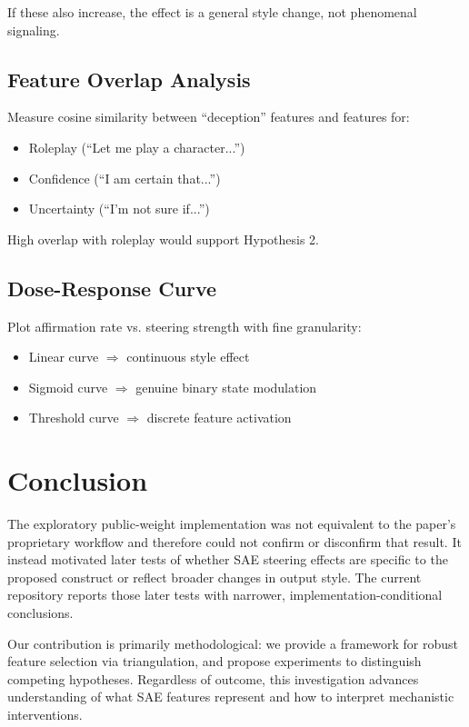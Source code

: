 \documentclass[11pt]{article}
\begin{document}
If these also increase, the effect is a general style change, not phenomenal signaling.

\subsection{Feature Overlap Analysis}

Measure cosine similarity between ``deception'' features and features for:
\begin{itemize}
    \item Roleplay (``Let me play a character...'')
    \item Confidence (``I am certain that...'')
    \item Uncertainty (``I'm not sure if...'')
\end{itemize}

High overlap with roleplay would support Hypothesis 2.

\subsection{Dose-Response Curve}

Plot affirmation rate vs. steering strength with fine granularity:
\begin{itemize}
    \item Linear curve $\Rightarrow$ continuous style effect
    \item Sigmoid curve $\Rightarrow$ genuine binary state modulation
    \item Threshold curve $\Rightarrow$ discrete feature activation
\end{itemize}

\section{Conclusion}

The exploratory public-weight implementation was not equivalent to the paper's proprietary workflow and therefore could not confirm or disconfirm that result. It instead motivated later tests of whether SAE steering effects are specific to the proposed construct or reflect broader changes in output style. The current repository reports those later tests with narrower, implementation-conditional conclusions.

Our contribution is primarily methodological: we provide a framework for robust feature selection via triangulation, and propose experiments to distinguish competing hypotheses. Regardless of outcome, this investigation advances understanding of what SAE features represent and how to interpret mechanistic interventions.



\end{document}
